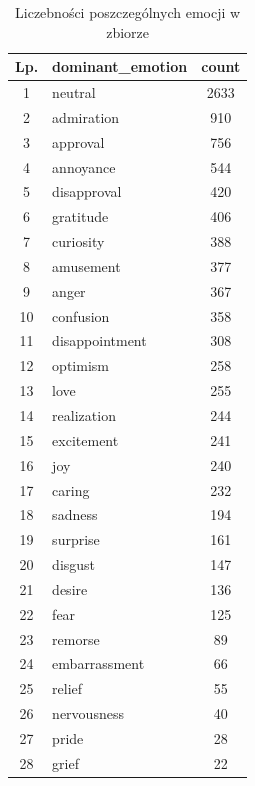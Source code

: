 \documentclass[wmii, inf, mgr]{uwmthesis}
\begin{document}
\begin{table}[H]
	\centering
	\renewcommand{\arraystretch}{1.2}
	\begin{tabular}{|c|l|c|}
		\hline
		\textbf{Lp.} & \textbf{dominant\_emotion} & \textbf{count} \\ \hline
		1 & neutral         & 2633 \\ \hline
		2 & admiration      & 910  \\ \hline
		3 & approval        & 756  \\ \hline
		4 & annoyance       & 544  \\ \hline
		5 & disapproval     & 420  \\ \hline
		6 & gratitude       & 406  \\ \hline
		7 & curiosity       & 388  \\ \hline
		8 & amusement       & 377  \\ \hline
		9 & anger           & 367  \\ \hline
		10 & confusion       & 358  \\ \hline
		11 & disappointment & 308  \\ \hline
		12 & optimism       & 258  \\ \hline
		13 & love           & 255  \\ \hline
		14 & realization    & 244  \\ \hline
		15 & excitement     & 241  \\ \hline
		16 & joy            & 240  \\ \hline
		17 & caring         & 232  \\ \hline
		18 & sadness        & 194  \\ \hline
		19 & surprise       & 161  \\ \hline
		20 & disgust        & 147  \\ \hline
		21 & desire         & 136  \\ \hline
		22 & fear           & 125  \\ \hline
		23 & remorse        & 89  \\ \hline
		24 & embarrassment  & 66  \\ \hline
		25 & relief         & 55  \\ \hline
		26 & nervousness    & 40  \\ \hline
		27 & pride          & 28  \\ \hline
		28 & grief          & 22  \\ \hline
	\end{tabular}
	\caption{Liczebności poszczególnych emocji w zbiorze}
	\label{tab:emocje_count}
\end{table} 
\end{document}
